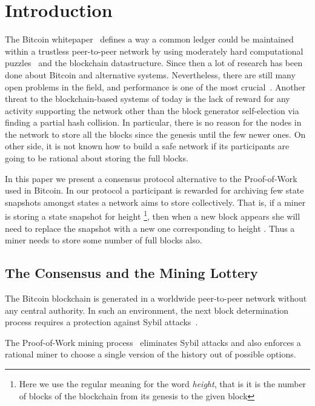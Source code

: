 \documentclass[conference,compsoc]{IEEEtran}
\begin{document}
\IEEEpeerreviewmaketitle

\section{Introduction}
\label{intr_section}

The Bitcoin whitepaper~\cite{Nakamoto2008} defines a way a common ledger could be maintained within a trustless peer-to-peer network by using moderately hard computational puzzles~\cite{milleranonymous} and the blockchain datastructure. Since then a lot of research has been done about Bitcoin and alternative systems. Nevertheless, there are still many open problems in the field, and performance is one of the most crucial~\cite{cromanscaling}. Another threat to the blockchain-based systems of today is the lack of reward for any activity supporting the network other than the block generator self-election via finding a partial hash collision. In particular, there is no reason for the nodes in the network to store all the blocks since the genesis until the few newer ones. On other side, it is not known how to build a safe network if its participants are going to be rational about storing the full blocks.

In this paper we present a consensus protocol alternative to the Proof-of-Work used in Bitcoin. In our protocol a participant is rewarded for archiving few state snapshots amongst  states a network aims to store collectively. That is, if a miner is storing a state snapshot for height \footnote{Here we use the regular meaning for the word {\it height}, that is it is the number of blocks of the blockchain from its genesis to the given block}, then when a new block appears she will need to replace the snapshot with a new one corresponding to height . Thus a miner needs to store some number of full blocks also.


\subsection{The Consensus and the Mining Lottery}

The Bitcoin blockchain is generated in a worldwide peer-to-peer network without any central authority. In such an environment, the next block determination process requires a protection against Sybil attacks~\cite{douceur2002sybil}. 

The Proof-of-Work mining process~\cite{Nakamoto2008} eliminates Sybil attacks and also enforces a rational miner to choose a single version of the history out of possible options. 
\end{document}
